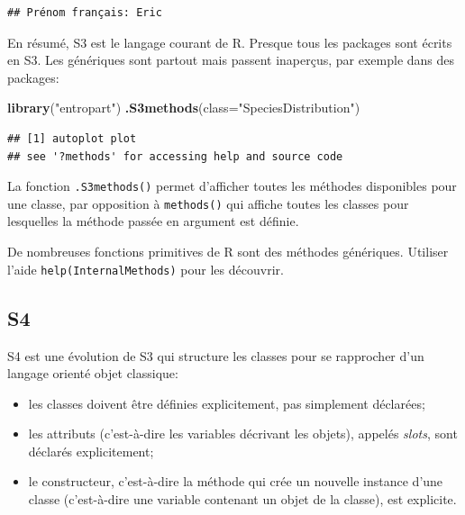 \documentclass[
  12pt,
  french,
  a4paper,
  extrafontsizes,onecolumn,openright
  ]{memoir}
\newenvironment{Shaded}{\begin{snugshade}}{\end{snugshade}}
\newcommand{\AttributeTok}[1]{\textcolor[rgb]{0.13,0.29,0.53}{#1}}
\newcommand{\FunctionTok}[1]{\textcolor[rgb]{0.13,0.29,0.53}{\textbf{#1}}}
\newcommand{\NormalTok}[1]{#1}
\newcommand{\StringTok}[1]{\textcolor[rgb]{0.31,0.60,0.02}{#1}}
\providecommand{\tightlist}{%
  \setlength{\itemsep}{0pt}\setlength{\parskip}{0pt}}
\begin{document}
\begin{verbatim}
## Prénom français: Eric
\end{verbatim}

\normalsize

En résumé, S3 est le langage courant de R.
Presque tous les packages sont écrits en S3.
Les génériques sont partout mais passent inaperçus, par exemple dans des packages:

\scriptsize

\begin{Shaded}
\begin{Highlighting}[]
\FunctionTok{library}\NormalTok{(}\StringTok{"entropart"}\NormalTok{)}
\FunctionTok{.S3methods}\NormalTok{(}\AttributeTok{class=}\StringTok{"SpeciesDistribution"}\NormalTok{)}
\end{Highlighting}
\end{Shaded}

\begin{verbatim}
## [1] autoplot plot    
## see '?methods' for accessing help and source code
\end{verbatim}

\normalsize

La fonction \texttt{.S3methods()} permet d'afficher toutes les méthodes disponibles pour une classe, par opposition à \texttt{methods()} qui affiche toutes les classes pour lesquelles la méthode passée en argument est définie.

De nombreuses fonctions primitives de R sont des méthodes génériques.
Utiliser l'aide \texttt{help(InternalMethods)} pour les découvrir.

\subsection{S4}\label{s4}

S4 est une évolution de S3 qui structure les classes pour se rapprocher d'un langage orienté objet classique:

\begin{itemize}
\tightlist
\item
  les classes doivent être définies explicitement, pas simplement déclarées;
\item
  les attributs (c'est-à-dire les variables décrivant les objets), appelés \emph{slots}, sont déclarés explicitement;
\item
  le constructeur, c'est-à-dire la méthode qui crée un nouvelle instance d'une classe (c'est-à-dire une variable contenant un objet de la classe), est explicite.
\end{itemize}
\end{document}
